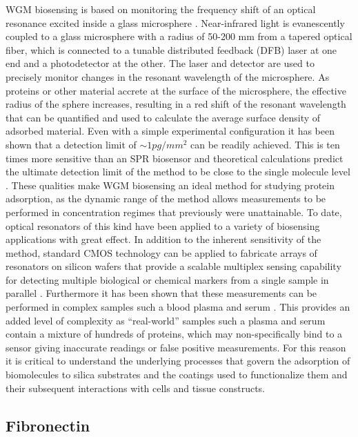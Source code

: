 WGM biosensing is based on monitoring the frequency shift of an optical
resonance excited inside a glass microsphere \cite{Vollmer2005,Vollmer2002}.
Near-infrared light is evanescently coupled to a glass microsphere
with a radius of 50-200 \textgreek{m}m from a tapered optical fiber,
which is connected to a tunable distributed feedback (DFB) laser at
one end and a photodetector at the other. The laser and detector are
used to precisely monitor changes in the resonant wavelength of the
microsphere. As proteins or other material accrete at the surface
of the microsphere, the effective radius of the sphere increases,
resulting in a red shift of the resonant wavelength that can be quantified
and used to calculate the average surface density of adsorbed material.
Even with a simple experimental configuration \cite{Vollmer2002}
it has been shown that a detection limit of $\sim1pg/mm^{2}$ can
be readily achieved. This is ten times more sensitive than an SPR
biosensor and theoretical calculations predict the ultimate detection
limit of the method to be close to the single molecule level \cite{Armani2003,Vollmer2008,Vollmer2008a,Arnold2003}.
These qualities make WGM biosensing an ideal method for studying protein
adsorption, as the dynamic range of the method allows measurements
to be performed in concentration regimes that previously were unattainable.
To date, optical resonators of this kind have been applied to a variety
of biosensing applications with great effect. In addition to the inherent
sensitivity of the method, standard CMOS technology can be applied
to fabricate arrays of resonators on silicon wafers that provide a
scalable multiplex sensing capability for detecting multiple biological
or chemical markers from a single sample in parallel \cite{Luchansky2010,Washburn2009}.
Furthermore it has been shown that these measurements can be performed
in complex samples such a blood plasma and serum \cite{Luchansky2011}.
This provides an added level of complexity as {}``real-world'' samples
such a plasma and serum contain a mixture of hundreds of proteins,
which may non-specifically bind to a sensor giving inaccurate readings
or false positive measurements. For this reason it is critical to
understand the underlying processes that govern the adsorption of
biomolecules to silica substrates and the coatings used to functionalize
them and their subsequent interactions with cells and tissue constructs.


\subsection{Fibronectin}

